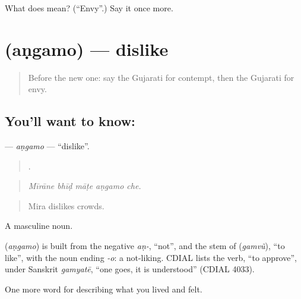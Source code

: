 \begin{tcolorbox}[breakable,colback=teal!4,colframe=teal!35!black,title={Before you move on}]
What does  mean? (\textquotedblleft{}Envy\textquotedblright{}.) Say it once more.
\end{tcolorbox}
\section[\texorpdfstring{\gu{અણગમો} (aṇgamo)}{અણગમો (aṇgamo)}]{ (aṇgamo) — dislike}

\label{lesson:GU-C457-angamo}



\begin{quote}
Before the new one: say the Gujarati for contempt, then the Gujarati for envy.
\end{quote}

\subsection*{You'll want to know: }
\textbf{} — \emph{aṇgamo} — \textquotedblleft{}dislike\textquotedblright{}.

\begin{quote}
    .
\end{quote}

\begin{quote}
\emph{Mīrāne bhīḍ māṭe aṇgamo che.}
\end{quote}

\begin{quote}
Mira dislikes crowds.
\end{quote}

A masculine noun.

\begin{cousinweb}
\textbf{} (\emph{aṇgamo}) is built from the negative \emph{aṇ-}, \textquotedblleft{}not\textquotedblright{}, and the stem of \textbf{} (\emph{gamvũ}), \textquotedblleft{}to like\textquotedblright{}, with the noun ending \emph{-o}: a not-liking. CDIAL lists the verb, \textquotedblleft{}to approve\textquotedblright{}, under Sanskrit \emph{gamyatē}, \textquotedblleft{}one goes, it is understood\textquotedblright{} (CDIAL 4033).
\end{cousinweb}

\begin{grammarlens}[title={What you've built}]
One more word for describing what you lived and felt.
\end{grammarlens}

